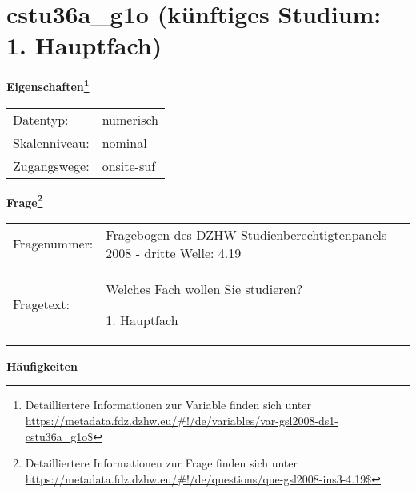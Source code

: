 
    \setcounter{footnote}{0}

    \vspace*{-1.8cm}
	\section{cstu36a\_g1o (künftiges Studium: 1. Hauptfach)}
	\label{section:cstu36a_g1o}



    \vspace*{0.5cm}
    \noindent\textbf{Eigenschaften\footnote{Detailliertere Informationen zur Variable finden sich unter
		\url{https://metadata.fdz.dzhw.eu/\#!/de/variables/var-gsl2008-ds1-cstu36a_g1o$}}}\\
	\begin{tabularx}{\hsize}{@{}lX}
	Datentyp: & numerisch \\
	Skalenniveau: & nominal \\
	Zugangswege: &
	  onsite-suf
 \\
    \end{tabularx}



				\vspace*{0.5cm}
                \noindent\textbf{Frage\footnote{Detailliertere Informationen zur Frage finden sich unter
		              \url{https://metadata.fdz.dzhw.eu/\#!/de/questions/que-gsl2008-ins3-4.19$}}}\\
				\begin{tabularx}{\hsize}{@{}lX}
					Fragenummer: &
					  Fragebogen des DZHW-Studienberechtigtenpanels 2008 - dritte Welle:
					  4.19
 \\
					Fragetext: & Welches Fach wollen Sie studieren?\par  1. Hauptfach \\
				\end{tabularx}





        		\vspace*{0.5cm}
                \noindent\textbf{Häufigkeiten}

